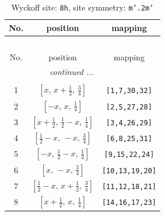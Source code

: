 \documentclass[fleqn,8pt]{jsarticle}
\begin{document}
\begin{longtable}{ccc}
\caption{Wyckoff site: {\tt 8h}, site symmetry: {\tt m'.2m'}}
 \\
 \hline \hline
No. & position & mapping \\ \hline \endfirsthead

\multicolumn{2}{l}{\tablename\ \thetable{}} \\
 \hline \hline
No. & position & mapping \\ \hline \endhead

 \hline \hline
\multicolumn{2}{r}{\footnotesize\it continued ...} \\ \endfoot

 \hline \hline
\multicolumn{2}{r}{} \\ \endlastfoot

1 & $\left[ x,\, x + \frac{1}{2},\, \frac{3}{4} \right]$ & {\tt [1,7,30,32]} \\ \hline
2 & $\left[ - x,\, x,\, \frac{1}{4} \right]$ & {\tt [2,5,27,28]} \\ \hline
3 & $\left[ x + \frac{1}{2},\, \frac{1}{2} - x,\, \frac{1}{4} \right]$ & {\tt [3,4,26,29]} \\ \hline
4 & $\left[ \frac{1}{2} - x,\, - x,\, \frac{3}{4} \right]$ & {\tt [6,8,25,31]} \\ \hline
5 & $\left[ - x,\, \frac{1}{2} - x,\, \frac{1}{4} \right]$ & {\tt [9,15,22,24]} \\ \hline
6 & $\left[ x,\, - x,\, \frac{3}{4} \right]$ & {\tt [10,13,19,20]} \\ \hline
7 & $\left[ \frac{1}{2} - x,\, x + \frac{1}{2},\, \frac{3}{4} \right]$ & {\tt [11,12,18,21]} \\ \hline
8 & $\left[ x + \frac{1}{2},\, x,\, \frac{1}{4} \right]$ & {\tt [14,16,17,23]} \\
\end{longtable}
\renewcommand{\arraystretch}{1.2}
\end{document}
